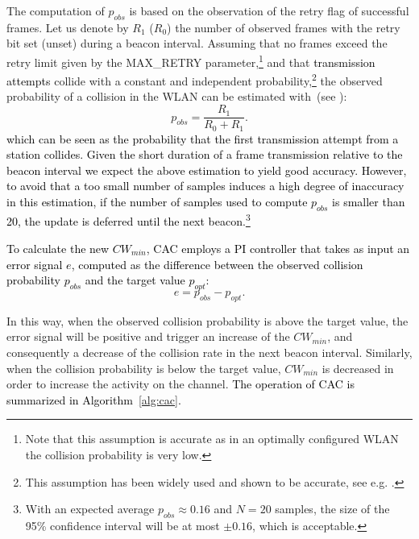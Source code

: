 \documentclass[a4paper,10pt]{article}
\newcommand{\revs}[1]{\textcolor{black}{#1}}
\begin{document}
The computation of $p_{obs}$ is based on the observation of the retry flag of successful frames. Let us denote by $R_1$ ($R_0$) the number of observed frames with the retry bit set (unset) during a beacon interval. Assuming that no frames exceed the retry limit given by the {\ttfamily MAX\_RETRY} parameter,\footnote{Note that this assumption is accurate as in an optimally configured WLAN the collision probability is very low.} and that \revs{transmission attempts} collide with a constant and independent probability,\footnote{This assumption has been widely used and shown to be accurate, see e.g. \cite{bianchi00}.} the observed probability of a collision in the WLAN can be estimated with~(see \cite{patras09monet}):
\begin{equation}
\label{eq:p_others}
p_{obs} = \frac{R_1}{R_0+R_1}.
\end{equation}
\revs{which can be seen as the probability that the first transmission attempt from a station collides. Given the short duration of a frame transmission relative to the beacon interval we expect the above estimation to yield good accuracy. However, to avoid that a too small number of samples induces a high degree of inaccuracy in this estimation, if the number of samples used to compute $p_{obs}$ is smaller than 20, the update is  deferred until the next beacon.\footnote{With an expected average $p_{obs} \approx 0.16$ and $N = 20$ samples, the size of the 95\% confidence interval will be at most $\pm 0.16$, which is acceptable.}}

\revs{To calculate the new $CW_{min}$, CAC employs a PI controller that takes as input an error signal $e$, computed as the difference between the observed collision probability $p_{obs}$ and the target value $p_{opt}$:}
\begin{equation}
\label{eq:e_cac}
e = p_{obs} - p_{opt}.
\end{equation}

In this way, when the observed collision probability is above the target value, the error signal will be positive and trigger an increase of the $CW_{min}$, and consequently a decrease of the collision rate in the next beacon interval. Similarly, when the collision probability is below the target value, $CW_{min}$ is decreased in order to increase the activity on the channel. \revs{The operation of CAC is summarized in Algorithm~\ref{alg:cac}.}
\end{document}
